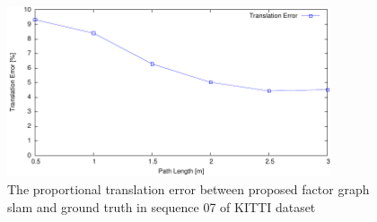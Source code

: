 \documentclass[master,korean,final]{cbnu-ecs}
\begin{document}
\begin{figure}[!ht]
 \centering
	\includegraphics[width=360px]{img/seq07tl.pdf}
  \caption{The proportional translation error between proposed factor graph slam and ground truth in sequence 07 of KITTI dataset}
\label{seq07tl}
\end{figure}


\end{document}
